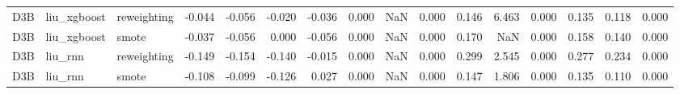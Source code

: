 \begin{tabular}{lllrrrrrrrrrrrrr}
D3B & liu_xgboost & reweighting & -0.044 & -0.056 & -0.020 & -0.036 & 0.000 & NaN & 0.000 & 0.146 & 6.463 & 0.000 & 0.135 & 0.118 & 0.000 \\
D3B & liu_xgboost & smote & -0.037 & -0.056 & 0.000 & -0.056 & 0.000 & NaN & 0.000 & 0.170 & NaN & 0.000 & 0.158 & 0.140 & 0.000 \\
D3B & liu_rnn & reweighting & -0.149 & -0.154 & -0.140 & -0.015 & 0.000 & NaN & 0.000 & 0.299 & 2.545 & 0.000 & 0.277 & 0.234 & 0.000 \\
D3B & liu_rnn & smote & -0.108 & -0.099 & -0.126 & 0.027 & 0.000 & NaN & 0.000 & 0.147 & 1.806 & 0.000 & 0.135 & 0.110 & 0.000 \\
\bottomrule
\end{tabular}
